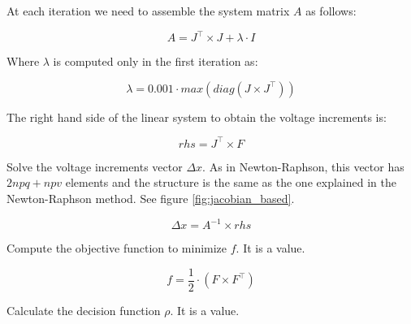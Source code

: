 \documentclass[nols,a4paper,twoside,notoc,fleqn]{tufte-book}
\begin{document}
At each iteration we need to assemble the system matrix $A$ as follows:
%
%
%


\begin{equation}
A = J^\top \times J + \lambda \cdot I
\label{eq:lm_A}
\end{equation}

Where $\lambda$ is computed only in the first iteration as:

\begin{equation}
\lambda = 0.001 \cdot max(diag(J \times J^\top))
\end{equation}

The right hand side of the linear system to obtain the voltage increments is:


\begin{equation}
rhs = J^\top \times F
\label{eq:lm_rhs}
\end{equation}


Solve the voltage increments vector $\Delta x$. As in Newton-Raphson, this vector has $2npq+npv$ elements and the structure is the same as the one explained in the Newton-Raphson method. See figure \ref{fig:jacobian_based}.


\begin{equation}
\Delta x = A^{-1} \times rhs
\label{eq:lm_solve}
\end{equation}



Compute the objective function to minimize $f$. It is a value.

\begin{equation}
f = \frac{1}{2} \cdot (F \times F^\top)
\label{eq:lm_f}
\end{equation}

Calculate the decision function $\rho$. It is a value.

\end{document}
